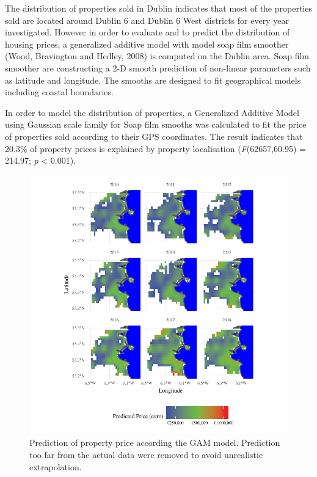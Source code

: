 \documentclass[]{elsarticle} %
\begin{document}
The distribution of properties sold in Dublin indicates that most of the
properties sold are located around Dublin 6 and Dublin 6 West districts
for every year investigated. However in order to evaluate and to predict
the distribution of housing prices, a generalized additive model with
model soap film smoother (Wood, Bravington and Hedley, 2008) is computed
on the Dublin area. Soap film smoother are constructing a 2-D smooth
prediction of non-linear parameters such as latitude and longitude. The
smooths are designed to fit geographical models including coastal
boundaries.

In order to model the distribution of properties, a Generalized Additive
Model using Gaussian scale family for Soap film smooths was calculated
to fit the price of properties sold according to their GPS coordinates.
The result indicates that 20.3\% of property prices is explained by
property localisation (\emph{F}(62657,60.95) = 214.97; \emph{p}
\textless{} 0.001).

\begin{figure}[H]
\includegraphics{property_price_paper_new_files/figure-latex/gam-year-plot-1} \caption{Prediction of property price according the GAM model. Prediction too far from the actual data were removed to avoid unrealistic extrapolation.}\label{fig:gam-year-plot}
\end{figure}
\end{document}
